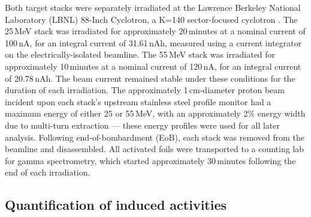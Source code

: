 Both target stacks were 
separately irradiated at the  Lawrence Berkeley National Laboratory  (LBNL)
88-Inch Cyclotron, a  K=140 sector-focused cyclotron \cite{7999622}.
The 25\,MeV stack was irradiated for approximately 20\,minutes at a nominal current of 100\,nA,  for an  integral current of 31.61\,nAh, measured using a current integrator on the electrically-isolated beamline. 
The 55\,MeV stack was irradiated for approximately 10\,minutes at a nominal current of 120\,nA,  for an  integral current of 20.78\,nAh. 
The beam current
remained stable under these conditions for the duration of each irradiation.
The approximately 1\,cm-diameter proton beam incident upon each stack's upstream stainless steel profile monitor had a maximum energy of either 25 or 55\,MeV, with an approximately 2\% energy width due to multi-turn extraction --- these energy profiles were used for all later analysis.
Following end-of-bombardment (EoB), each stack was removed from the beamline and disassembled.
All activated foils were transported to a counting lab for gamma spectrometry, which started approximately 30\,minutes following the end of each irradiation.





\subsection{\label{sec:spectroscopy_fe}Quantification of induced activities}


